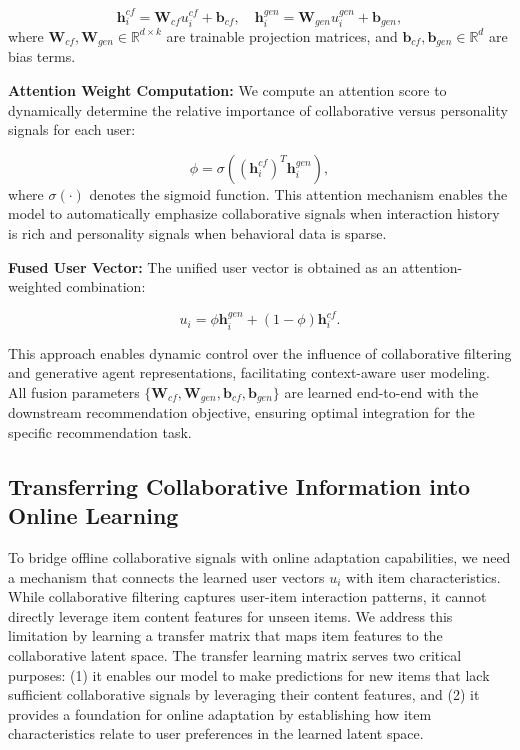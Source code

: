 \documentclass[acmsmall]{acmart}
\begin{document}
\begin{equation}
\mathbf{h}^{cf}_i = \mathbf{W}_{cf} u^{cf}_i + \mathbf{b}_{cf}, \quad \mathbf{h}^{gen}_i = \mathbf{W}_{gen} u^{gen}_i + \mathbf{b}_{gen},
\label{eq:projection_fusion}
\end{equation}
where $\mathbf{W}_{cf}, \mathbf{W}_{gen} \in \mathbb{R}^{d \times k}$ are trainable projection matrices, and $\mathbf{b}_{cf}, \mathbf{b}_{gen} \in \mathbb{R}^d$ are bias terms.

\textbf{Attention Weight Computation:} We compute an attention score to dynamically determine the relative importance of collaborative versus personality signals for each user:

\begin{equation}
\phi = \sigma\left((\mathbf{h}^{cf}_i)^T \mathbf{h}^{gen}_i\right),
\label{eq:attention_weight}
\end{equation}
where $\sigma(\cdot)$ denotes the sigmoid function. This attention mechanism enables the model to automatically emphasize collaborative signals when interaction history is rich and personality signals when behavioral data is sparse.

\textbf{Fused User Vector:} The unified user vector is obtained as an attention-weighted combination:

\begin{equation}
u_i = \phi \mathbf{h}^{gen}_i + (1 - \phi) \mathbf{h}^{cf}_i.
\label{eq:final_fusion}
\end{equation}

This approach enables dynamic control over the influence of collaborative filtering and generative agent representations, facilitating context-aware user modeling. All fusion parameters $\{\mathbf{W}_{cf}, \mathbf{W}_{gen}, \mathbf{b}_{cf}, \mathbf{b}_{gen}\}$ are learned end-to-end with the downstream recommendation objective, ensuring optimal integration for the specific recommendation task.

\subsection{Transferring Collaborative Information into Online Learning}
\label{sec:transfer_learning}


To bridge offline collaborative signals with online adaptation capabilities, we need a mechanism that connects the learned user vectors $u_i$ with item characteristics. While collaborative filtering captures user-item interaction patterns, it cannot directly leverage item content features for unseen items. We address this limitation by learning a transfer matrix that maps item features to the collaborative latent space.
 The transfer learning matrix serves two critical purposes: (1) it enables our model to make predictions for new items that lack sufficient collaborative signals by leveraging their content features, and (2) it provides a foundation for online adaptation by establishing how item characteristics relate to user preferences in the learned latent space.
\end{document}
